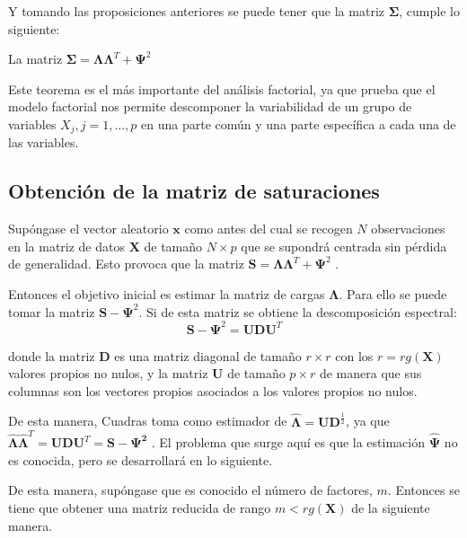 \noindent Y tomando las proposiciones anteriores se puede tener que la matriz $\mathbf{\Sigma}$, cumple lo siguiente:
\begin{teorema}\label{Descomposición Varianza}
La matriz $\mathbf{\Sigma}=\mathbf{\Lambda}\mathbf{\Lambda}^T+\mathbf{\Psi}^2$
\end{teorema}

\noindent Este teorema es el más importante del análisis factorial, ya que   prueba que el modelo factorial nos permite descomponer la variabilidad de un grupo de variables $X_j,j=1, \ldots , p$ en una parte común y una parte específica a cada una de las variables. 

\subsection{Obtención de la matriz de saturaciones}
\noindent Supóngase el vector aleatorio $\mathbf{x}$ como antes del cual se recogen $N$ observaciones en la matriz de datos $\mathbf{X}$ de tamaño $N\times p$ que se supondrá centrada sin pérdida de generalidad. Esto provoca que la matriz $\mathbf{S}=\mathbf{\Lambda}\mathbf{\Lambda}^T+\mathbf{\Psi}^2$ \cite{Peña 2002}. 

\noindent Entonces el objetivo inicial es estimar la matriz de cargas $\mathbf{\Lambda}$. Para ello se puede tomar la matriz $\mathbf{S}-\mathbf{\Psi}^2$. Si de esta matriz se obtiene la descomposición espectral:
\begin{equation}
\mathbf{S}-\mathbf{\Psi}^2=\mathbf{U}\mathbf{D}\mathbf{U}^T
\end{equation}

\noindent donde la matriz $\mathbf{D}$ es una matriz diagonal de tamaño $r\times r$ con los $r=rg(\mathbf{X})$ valores propios no nulos, y la matriz $\mathbf{U}$ de tamaño $p\times r$ de manera que sus columnas son los vectores propios asociados a los valores propios no nulos. 

\noindent De esta manera, Cuadras  toma como estimador de $\mathbf{\hat{\Lambda}}=\mathbf{UD}^{\frac{1}{2}}$, ya que \\ $\mathbf{\hat{\Lambda}}\mathbf{\hat{\Lambda}}^T=\mathbf{U}\mathbf{D}\mathbf{U}^T= \mathbf{S-\Psi^2}$ \cite{Cuadras 2014}. El problema que surge aquí es que la estimación $\mathbf{\hat{\Psi}}$ no es conocida, pero se desarrollará en lo siguiente. 

\noindent De esta manera, supóngase que es conocido el número de factores, $m$. Entonces se tiene que obtener una matriz reducida de rango $m<rg(\mathbf{X})$ de la siguiente manera. 

